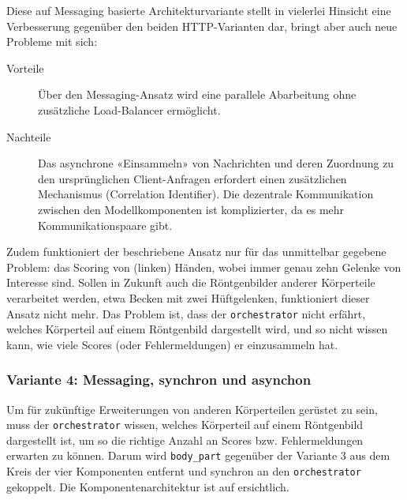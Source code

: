Diese auf Messaging basierte Architekturvariante stellt in vielerlei Hinsicht eine Verbesserung gegenüber den beiden HTTP-Varianten dar, bringt aber auch neue Probleme mit sich:

\begin{description}
    \item[Vorteile] Über den Messaging-Ansatz wird eine parallele Abarbeitung ohne zusätzliche Load-Balancer ermöglicht.
    \item[Nachteile] Das asynchrone «Einsammeln» von Nachrichten und deren Zuordnung zu den ursprünglichen Client-Anfragen erfordert einen zusätzlichen Mechanismus (Correlation Identifier). Die dezentrale Kommunikation zwischen den Modellkomponenten ist komplizierter, da es mehr Kommunikationspaare gibt.
\end{description}

Zudem funktioniert der beschriebene Ansatz nur für das unmittelbar gegebene Problem: das Scoring von (linken) Händen, wobei immer genau zehn Gelenke von Interesse sind. Sollen in Zukunft auch die Röntgenbilder anderer Körperteile verarbeitet werden, etwa Becken mit zwei Hüftgelenken, funktioniert dieser Ansatz nicht mehr. Das Problem ist, dass der \texttt{orchestrator} nicht erfährt, welches Körperteil auf einem Röntgenbild dargestellt wird, und so nicht wissen kann, wie viele Scores (oder Fehlermeldungen) er einzusammeln hat.

\subsubsection{Variante 4: Messaging, synchron und asynchon}
\label{sec:variante-4-messaging}

Um für zukünftige Erweiterungen von anderen Körperteilen gerüstet zu sein, muss der \texttt{orchestrator} wissen, welches Körperteil auf einem Röntgenbild dargestellt ist, um so die richtige Anzahl an Scores bzw. Fehlermeldungen erwarten zu können. Darum wird \texttt{body\_part} gegenüber der Variante 3 aus dem Kreis der vier Komponenten entfernt und synchron an den \texttt{orchestrator} gekoppelt. Die Komponentenarchitektur ist auf  ersichtlich.

